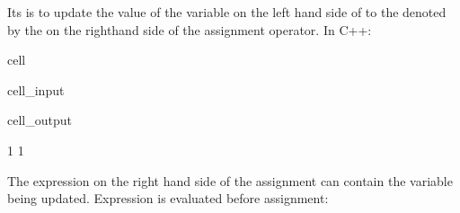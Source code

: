 \documentclass[a4paper,10pt,english]{jupyterBook}
\begin{document}
\begin{sphinxVerbatim}[commandchars=\\\{\}]
\end{sphinxVerbatim}

\sphinxAtStartPar
Its  is to update the value of the variable  on the left hand side of \sphinxcode{\sphinxupquote{=}} to the  denoted by the   on the right\sphinxhyphen{}hand side of the assignment operator. In C++:

\begin{sphinxuseclass}{cell}\begin{sphinxVerbatimInput}

\begin{sphinxuseclass}{cell_input}
\begin{sphinxVerbatim}[commandchars=\\\{\}]


\end{sphinxVerbatim}

\end{sphinxuseclass}\end{sphinxVerbatimInput}
\begin{sphinxVerbatimOutput}

\begin{sphinxuseclass}{cell_output}
\begin{sphinxVerbatim}[commandchars=\\\{\}]
1 1 
\end{sphinxVerbatim}

\end{sphinxuseclass}\end{sphinxVerbatimOutput}

\end{sphinxuseclass}
\sphinxAtStartPar
The expression on the right hand side of the assignment can contain the variable being updated. Expression is evaluated before assignment:
\end{document}
